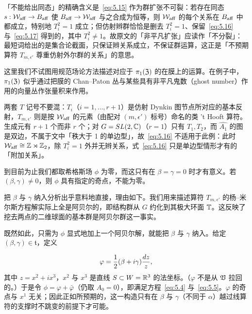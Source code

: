 \begin{yizhu}[含糊点拨]
「不能给出同态」的精确含义是~\eqref{eq:5.15} 作为群扩张不可裂：若存在同态 $s:{\mathcal W}_{\rm aff}\to B_{\rm aff}$ 使 $B_{\rm aff}\to{\mathcal W}_{\rm aff}$ 与之合成为恒等，则 ${\mathcal W}_{\rm aff}$ 的每个关系在 $B_{\rm aff}$ 中都成立，特别地 $T_i^2=1$ 成立；但仿射辫群恰恰是删去 $T_i^2=1$、保留~\eqref{eq:5.16} 与~\eqref{eq:5.17} 得到的，其中 $T_i^2\ne 1$。故原文的「非平凡扩张」应读作「不分裂」：最短词给出的是集合论截面，只保证辫关系成立，不保证群运算，这正是「不预期算符 $T_{m,\epsilon'}$ 尊重仿射外尔群的关系」的意思。
\end{yizhu}


这里我们不试图用规范场论方法描述对应于 $\pi_1(\mathfrak{Z})$ 的在膜上的运算。在例子中，$\pi_1(\mathfrak{Z})$ 似乎通过把膜的 Chan–Paton 丛与某些具有非平凡鬼数（ghost number）作用的向量丛作张量积来作用。

\begin{yizhu}[易错点]
两套 $T$ 记号不要混：$T_i$（$i=1,\dots,r+1$）是仿射 Dynkin 图节点所对应的基本反射，$T_{m,\epsilon'}$ 则是按 ${\mathcal W}_{\rm aff}$ 的元素（由配对 $(m,\epsilon')$ 标号）命名的类 't Hooft 算符。生成元有 $r+1$ 个而非 $r$ 个；对 $G=SL(2,{\mathbb{C}})$（$r=1$）只有 $T_1,T_2$，而 $\widehat{A_1}$ 的图是双边，不属于文中「秩大于 1 的单边型」，故~\eqref{eq:5.16} 不适用于此例：此时 ${\mathcal W}_{\rm aff}\cong{\mathbb{Z}}\rtimes{\mathbb{Z}}_2$，除 $T_i^2=1$ 外并无辫关系，式~\eqref{eq:5.16} 只是单边型情形才有的「附加关系」。
\end{yizhu}



\bigskip{}

到目前为止我们都取希格斯场 $\phi$ 为零，而这只有在 $\beta=\gamma=0$ 时才有意义。若 $(\beta,\gamma)\not=0$，则 $\phi$ 具有指定的奇点，不能为零。

把 $\beta$ 与 $\gamma$ 纳入分析出乎意料地直接，理由如下。我们用来描述算符 $T_{m,\epsilon'}$ 的杨–米尔斯方程解实际上全是阿贝尔的，即结构群从 $G$ 约化到其极大环面 ${\mathbb{T}}$。这反映了挖去两点的二维球面的基本群是阿贝尔群这一事实。

既然如此，只需为 $\phi$ 显式地加上一个阿贝尔解，就能把 $\beta$ 与 $\gamma$ 纳入。给定 $(\beta,\gamma)\in \mathfrak t$，定义

\setcounter{equation}{17}
\begin{equation}\label{eq:5.18}
  \varphi =\frac{1}{2}(\beta+i\gamma){dz\over z},
\end{equation}
 其中 $z=x^2+ix^3$，$x^2$ 与 $x^3$ 是直线 $S\subset W={\mathbb{R}}^3$ 的法坐标。（$\varphi$ 不是从 $\mathfrak{V}$ 拉回的。）于是令 $\phi=\varphi+\bar\varphi$（仍取 $A_0=0$），即满足方程~\eqref{eq:5.4} 与~\eqref{eq:5.5}。$\varphi$ 的奇点与 $x^1$ 无关；因此正如所预期的，这一构造只有在 $\beta$ 与 $\gamma$（不同于 $\alpha$）越过线算符的支撑时不跳变的前提下才可能。

